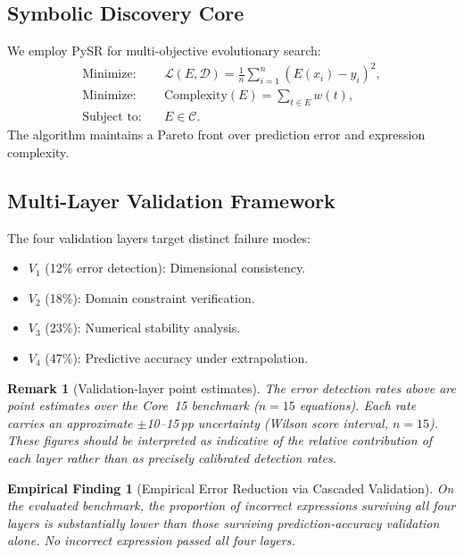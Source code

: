 \documentclass[twoside,11pt]{article}
\newtheorem{remark}[theorem]{Remark}
\newtheorem{finding}{Empirical Finding}
\begin{document}
\subsection{Symbolic Discovery Core}

We employ PySR \citep{cranmer2023pysr} for multi-objective evolutionary search:
\begin{align}
\text{Minimize:} \quad
& \mathcal{L}(E,\mathcal{D})
  = \frac{1}{n}\sum_{i=1}^n (E(x_i) - y_i)^2, \label{eq:loss}\\
\text{Minimize:} \quad
& \mathrm{Complexity}(E) = \sum_{t \in E} w(t), \label{eq:complexity}\\
\text{Subject to:} \quad
& E \in \mathcal{C}. \label{eq:constraints}
\end{align}
The algorithm maintains a Pareto front over prediction error and expression
complexity.

\subsection{Multi-Layer Validation Framework}
\label{sec:validation_detail}

The four validation layers target distinct failure modes:

\begin{itemize}
\item $V_1$ (12\% error detection): Dimensional consistency.
\item $V_2$ (18\%): Domain constraint verification.
\item $V_3$ (23\%): Numerical stability analysis.
\item $V_4$ (47\%): Predictive accuracy under extrapolation.
\end{itemize}

\begin{remark}[Validation-layer point estimates]
\label{rem:validation_ci}
The error detection rates above are point estimates over the Core~15 benchmark
($n=15$ equations).  Each rate carries an approximate $\pm$10--15\,pp
uncertainty (Wilson score interval, $n=15$).  These figures should be
interpreted as indicative of the relative contribution of each layer rather
than as precisely calibrated detection rates.
\end{remark}

\begin{finding}[Empirical Error Reduction via Cascaded Validation]
\label{prop:validation_reduction}
On the evaluated benchmark, the proportion of incorrect expressions surviving
all four layers is substantially lower than those surviving prediction-accuracy
validation alone.  No incorrect expression passed all four layers.
\end{finding}
\end{document}
